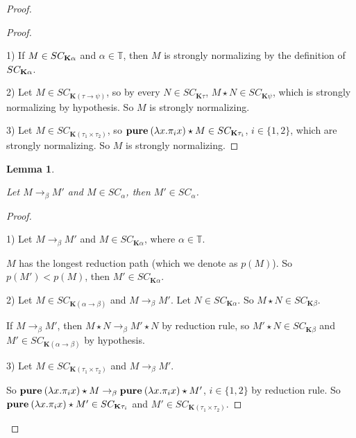 \documentclass[a4paper]{article}
\newtheorem{lemma}{Lemma}
\begin{document}
\begin{proof}
  \begin{proof}

$ $

  1) If $M \in SC_{{\bf K} \alpha}$ and $\alpha \in \mathbb{T}$, then $M$ is strongly normalizing by the
  definition of $SC_{{\bf K} \alpha}$.

  2) Let $M \in SC_{\textbf{K}(\tau \to \psi)}$, so by every $N \in SC_{\textbf{K}\tau}$,
  $M \star N \in SC_{\textbf{K}\psi}$, which is strongly normalizing by hypothesis. So $M$ is
  strongly normalizing.

  3) Let $M \in SC_{\textbf{K}(\tau_1 \times \tau_2)}$, so ${\bf pure \:} (\lambda x. \pi_i x) \star M \in
  SC_{\textbf{K}\tau_i}$, $i \in \{ 1,2 \}$, which are strongly normalizing. So $M$ is
  strongly normalizing.

  \end{proof}


  \begin{lemma}

  $ $

  Let $M \rightarrow_{\beta} M'$ and $M \in SC_{\alpha}$, then $M' \in SC_{\alpha}$.

  \end{lemma}


  \begin{proof}

$ $

  1) Let $M \rightarrow_{\beta} M'$ and $M \in SC_{\textbf{K}\alpha}$, where $\alpha \in \mathbb{T}$.

  $M$ has the longest reduction path (which we denote as $p(M)$). So $p(M') < p(M)$, then $M' \in SC_{\textbf{K}\alpha}$.

  2) Let $M \in SC_{\textbf{K}(\alpha \to \beta)}$ and $M \rightarrow_{\beta} M'$. Let $N \in
  SC_{\textbf{K}\alpha}$. So $M \star N \in SC_{\textbf{K}\beta}$.

  If $M \rightarrow_{\beta} M'$, then $M \star N \rightarrow_{\beta} M' \star N$ by reduction
  rule, so $M' \star N \in SC_{\textbf{K}\beta}$ and $M' \in SC_{\textbf{K}(\alpha \to \beta)}$ by
  hypothesis.

  3) Let $M \in SC_{\textbf{K}(\tau_1 \times \tau_2)}$ and $M \rightarrow_{\beta} M'$.

  So ${\bf pure \: } (\lambda x. \pi_i x) \star M \rightarrow_{\beta} {\bf pure \: } (\lambda x. \pi_i x)
  \star M'$, $i \in \{ 1, 2 \}$ by reduction rule. So ${\bf pure \: } (\lambda x. \pi_i x) \star M' \in
  SC_{\textbf{K} \tau_i }$ and $M' \in SC_{\textbf{K}(\tau_1 \times \tau_2)}$.


\end{proof}
\end{proof}
\end{document}
